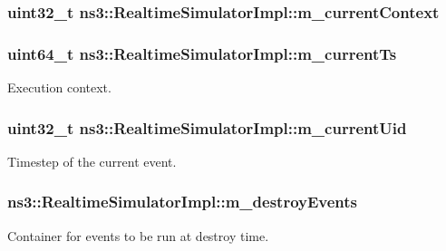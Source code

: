 \subsubsection[{\texorpdfstring{m\+\_\+current\+Context}{m_currentContext}}]{\setlength{\rightskip}{0pt plus 5cm}uint32\+\_\+t ns3\+::\+Realtime\+Simulator\+Impl\+::m\+\_\+current\+Context\hspace{0.3cm}{\ttfamily [private]}}\hypertarget{classns3_1_1RealtimeSimulatorImpl_a4b9c6ce7a99f0b0a6e115eb3d427976c}{}\label{classns3_1_1RealtimeSimulatorImpl_a4b9c6ce7a99f0b0a6e115eb3d427976c}
\subsubsection[{\texorpdfstring{m\+\_\+current\+Ts}{m_currentTs}}]{\setlength{\rightskip}{0pt plus 5cm}uint64\+\_\+t ns3\+::\+Realtime\+Simulator\+Impl\+::m\+\_\+current\+Ts\hspace{0.3cm}{\ttfamily [private]}}\hypertarget{classns3_1_1RealtimeSimulatorImpl_a613ff41dee1e66129c4d5cc81c00cf60}{}\label{classns3_1_1RealtimeSimulatorImpl_a613ff41dee1e66129c4d5cc81c00cf60}
Execution context. 
\subsubsection[{\texorpdfstring{m\+\_\+current\+Uid}{m_currentUid}}]{\setlength{\rightskip}{0pt plus 5cm}uint32\+\_\+t ns3\+::\+Realtime\+Simulator\+Impl\+::m\+\_\+current\+Uid\hspace{0.3cm}{\ttfamily [private]}}\hypertarget{classns3_1_1RealtimeSimulatorImpl_a74f7fe3f1ca8b69baac6261b11f1c2a6}{}\label{classns3_1_1RealtimeSimulatorImpl_a74f7fe3f1ca8b69baac6261b11f1c2a6}
Timestep of the current event. 
\subsubsection[{\texorpdfstring{m\+\_\+destroy\+Events}{m_destroyEvents}}]{ ns3\+::\+Realtime\+Simulator\+Impl\+::m\+\_\+destroy\+Events\hspace{0.3cm}{\ttfamily [private]}}\hypertarget{classns3_1_1RealtimeSimulatorImpl_a18d17218962a0da6376ac2c05ba9a71a}{}\label{classns3_1_1RealtimeSimulatorImpl_a18d17218962a0da6376ac2c05ba9a71a}
Container for events to be run at destroy time. 
